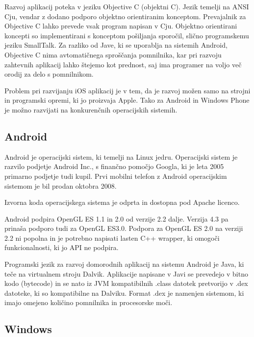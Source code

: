 Razvoj aplikacij poteka v jeziku Objective C (objektni C). Jezik temelji na ANSI Cju, vendar z dodano podporo objektno orientiranim konceptom. Prevajalnik za Objective C lahko prevede vsak program napisan v Cju. Objektno orientirani koncepti so implementirani s konceptom pošiljanja sporočil, slično programskemu jeziku SmallTalk. Za razliko od Jave, ki se uporablja na sistemih Android, Objective C nima avtomatičnega sproščanja pomnilnika, kar pri razvoju zahtevnih aplikacij lahko štejemo kot prednost, saj ima programer na voljo več orodij za delo s pomnilnikom. 

Problem pri razvijanju iOS aplikacij je v tem, da je razvoj možen samo na strojni in programski opremi, ki jo proizvaja Apple. Tako za Android in Windows Phone je možno razvijati na konkurenčnih operacijskih sistemih.

\subsection{Android}

Android je operacijski sistem, ki temelji na Linux jedru. Operacijski sistem je razvilo podjetje Android Inc., s finančno pomočjo Googla, ki je leta 2005 primarno podjetje tudi kupil. Prvi mobilni telefon z Android operacijskim sistemom je bil prodan oktobra 2008.

Izvorna koda operacijskega sistema je odprta in dostopna pod Apache licenco.

Android podpira OpenGL ES 1.1 in 2.0 od verzije 2.2 dalje. Verzija 4.3 pa prinaša podporo tudi za OpenGL ES3.0. Podpora za OpenGL ES 2.0 na verziji 2.2 ni popolna in je potrebno napisati lasten C++ wrapper, ki omogoči funkcionalnosti, ki jo API ne podpira.


Programski jezik za razvoj domorodnih aplikacij na sistemu Android je Java, ki teče na virtualnem stroju Dalvik. Aplikacije napisane v Javi se prevedejo v bitno kodo (bytecode) in se nato iz JVM kompatibilnih .class datotek pretvorijo v .dex datoteke, ki so kompatibilne na Dalviku. Format .dex je namenjen sistemom, ki imajo omejeno količino pomnilnika in procesorske moči.

\subsection{Windows}

% 

